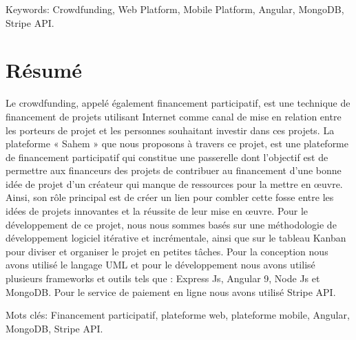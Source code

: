 Keywords: Crowdfunding, Web Platform, Mobile Platform, Angular, MongoDB, Stripe API.
\cleardoublepage%
\chapter*{Résumé}
%
Le crowdfunding, appelé également financement participatif, est une technique de financement de projets utilisant Internet comme canal de mise en relation entre les porteurs de projet et les personnes souhaitant investir dans ces projets.
La plateforme « Sahem » que nous proposons à travers ce projet, est une plateforme de financement participatif qui constitue une passerelle dont l’objectif est de permettre aux financeurs des projets de contribuer au financement d'une bonne idée de projet d’un créateur qui manque de ressources pour la mettre en œuvre. Ainsi, son rôle principal est de créer un lien pour combler cette fosse entre les idées de projets innovantes et la réussite de leur mise en œuvre. Pour le développement de ce projet, nous nous sommes basés sur une méthodologie de développement logiciel itérative et incrémentale, ainsi que sur le tableau Kanban pour diviser et organiser le projet en petites tâches. Pour la conception nous avons utilisé le langage UML et pour le développement nous avons utilisé plusieurs frameworks et outils tels que : Express Js, Angular 9, Node Js et MongoDB. Pour le service de paiement en ligne nous avons utilisé Stripe API.

Mots clés: Financement participatif, plateforme web, plateforme mobile, Angular, MongoDB, Stripe API.




